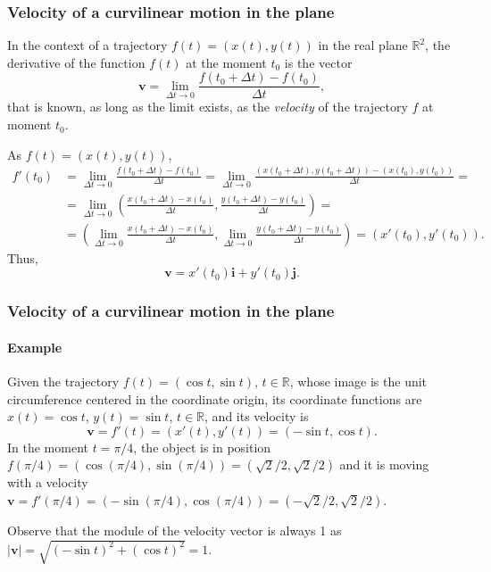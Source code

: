 \begin{frame}
\frametitle{Velocity of a curvilinear motion in the plane}
In the context of a trajectory $f(t)=(x(t),y(t))$ in the real plane $\mathbb{R}^2$, the derivative of the function $f(t)$ at the moment $t_0$ is the vector
\[
\mathbf{v} = \lim_{\Delta t\rightarrow 0} \frac{f(t_0+\Delta t)-f(t_0)}{\Delta t},
\]
that is known, as long as the limit exists, as the \emph{velocity} of the trajectory $f$ at moment $t_0$.

As $f(t)=(x(t),y(t))$,
\begin{align*}
f'(t_0)&=\lim_{\Delta t\rightarrow 0} \frac{f(t_0+\Delta t)-f(t_0)}{\Delta t} = \lim_{\Delta t\rightarrow 0} \frac{(x(t_0+\Delta t),y(t_0+\Delta t))-(x(t_0),y(t_0))}{\Delta t} =\\
&=  \lim_{\Delta t\rightarrow 0} \left(\frac{x(t_0+\Delta t)-x(t_0)}{\Delta t},\frac{y(t_0+\Delta t)-y(t_0)}{\Delta t}\right) =\\
&= \left(\lim_{\Delta t\rightarrow 0}\frac{x(t_0+\Delta t)-x(t_0)}{\Delta t},\lim_{\Delta t\rightarrow 0}\frac{y(t_0+\Delta t)-y(t_0)}{\Delta t}\right) = (x'(t_0),y'(t_0)).
\end{align*}
Thus, 
\[
\mathbf{v} = x'(t_0)\mathbf{i}+y'(t_0)\mathbf{j}.
\]
\end{frame}


\begin{frame}
\frametitle{Velocity of a curvilinear motion in the plane}
\framesubtitle{Example}
Given the trajectory $f(t) = (\cos t,\sin t)$, $t\in \mathbb{R}$, whose image is the unit circumference centered in the coordinate origin, its coordinate functions are $x(t) = \cos t$, $y(t) = \sin t$, $t\in \mathbb{R}$, and its velocity is
\[
\mathbf{v}=f'(t)=(x'(t),y'(t))=(-\sin t, \cos t).
\]
In the moment $t=\pi/4$, the object is in position $f(\pi/4) = (\cos(\pi/4),\sin(\pi/4)) =(\sqrt{2}/2,\sqrt{2}/2)$
and it is moving with a velocity $\mathbf{v}=f'(\pi/4)=(-\sin(\pi/4),\cos(\pi/4))=(-\sqrt{2}/2,\sqrt{2}/2)$.
\begin{center}
\scalebox{0.8}{}
\end{center}
Observe that the module of the velocity vector is always 1 as
$|\mathbf{v}|=\sqrt{(-\sin t)^2+(\cos t)^2}=1$.
\end{frame}



